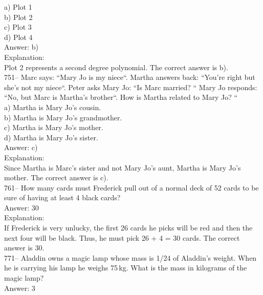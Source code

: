 \documentclass[letterpaper, 12pt]{article}
\begin{document}
\begin{center}

    \end{center}
a) Plot 1\\
b) Plot 2\\
c) Plot 3\\
d) Plot 4\\

Answer: b)\\

Explanation: \\
Plot 2 represents a second degree polynomial. The correct answer is b).\\

751-- Marc says: ``Mary Jo is my niece``.  Martha answers back:
``You're right but she's not my niece``. Peter asks Mary Jo: ``Is Marc married? `` Mary Jo responds: ``No, but Marc is Martha's brother``.  How is Martha related to Mary Jo? ``\\

a) Martha is Mary Jo's cousin.\\
b) Martha is Mary Jo's grandmother.\\
c) Martha is Mary Jo's mother.\\
d) Martha is Mary Jo's sister.\\
	
Answer: c)\\

Explanation: \\
Since Martha is Marc's sister and not Mary Jo's aunt, Martha is Mary Jo's mother. The correct answer is c).\\

761-- How many cards must Frederick pull out of a normal deck of 52 cards to be sure of having at least 4 black cards?\\

Answer: 30\\

Explanation: \\
If Frederick is very unlucky, the first 26 cards he picks will be red and then the next four will be black. Thus, he must pick 26 + 4 = 30 cards. The correct answer is 30.\\

771-- Aladdin owns a magic lamp whose mass is 1/24 of Aladdin's weight. When he is carrying his lamp he weighs 75\,kg.  What is the mass in kilograms of the magic lamp?\\

Answer: 3\\
\end{document}
